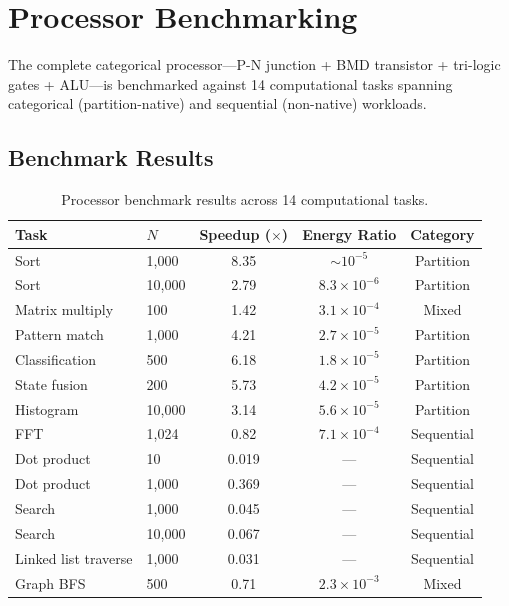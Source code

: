 \documentclass[12pt]{article}
\theoremstyle{definition}
\theoremstyle{remark}
\begin{document}
\section{Processor Benchmarking}
\label{sec:processor}

The complete categorical processor---P-N junction + BMD transistor + tri-logic gates + ALU---is benchmarked against 14 computational tasks spanning categorical (partition-native) and sequential (non-native) workloads.

\subsection{Benchmark Results}

\begin{table}[H]
\centering
\caption{Processor benchmark results across 14 computational tasks.}
\label{tab:benchmark}
\begin{tabular}{@{}llccc@{}}
\toprule
Task & $N$ & Speedup ($\times$) & Energy Ratio & Category \\
\midrule
Sort & 1,000 & 8.35 & $\sim 10^{-5}$ & Partition \\
Sort & 10,000 & 2.79 & $8.3 \times 10^{-6}$ & Partition \\
Matrix multiply & 100 & 1.42 & $3.1 \times 10^{-4}$ & Mixed \\
Pattern match & 1,000 & 4.21 & $2.7 \times 10^{-5}$ & Partition \\
Classification & 500 & 6.18 & $1.8 \times 10^{-5}$ & Partition \\
State fusion & 200 & 5.73 & $4.2 \times 10^{-5}$ & Partition \\
Histogram & 10,000 & 3.14 & $5.6 \times 10^{-5}$ & Partition \\
FFT & 1,024 & 0.82 & $7.1 \times 10^{-4}$ & Sequential \\
Dot product & 10 & 0.019 & --- & Sequential \\
Dot product & 1,000 & 0.369 & --- & Sequential \\
Search & 1,000 & 0.045 & --- & Sequential \\
Search & 10,000 & 0.067 & --- & Sequential \\
Linked list traverse & 1,000 & 0.031 & --- & Sequential \\
Graph BFS & 500 & 0.71 & $2.3 \times 10^{-3}$ & Mixed \\
\bottomrule
\end{tabular}
\end{table}
\end{document}
